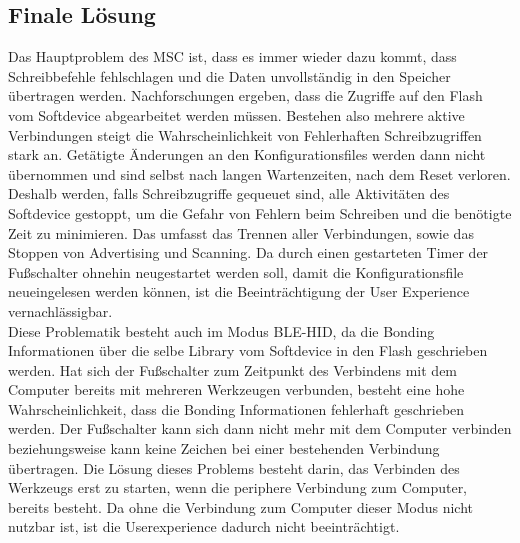 \subsection{Finale Lösung}
Das Hauptproblem des \ac{MSC} ist, dass es immer wieder dazu kommt, dass Schreibbefehle fehlschlagen und die Daten unvollständig in den Speicher übertragen werden. Nachforschungen ergeben, dass die Zugriffe auf den Flash vom Softdevice abgearbeitet werden müssen. Bestehen also mehrere aktive Verbindungen steigt die Wahrscheinlichkeit von Fehlerhaften Schreibzugriffen stark an. Getätigte Änderungen an den Konfigurationsfiles werden dann nicht übernommen und sind selbst nach langen Wartenzeiten, nach dem Reset verloren. Deshalb werden, falls Schreibzugriffe gequeuet sind, alle Aktivitäten des Softdevice gestoppt, um die Gefahr von Fehlern beim Schreiben und die benötigte Zeit zu minimieren. Das umfasst das Trennen aller Verbindungen, sowie das Stoppen von Advertising und Scanning. Da durch einen gestarteten Timer der Fußschalter ohnehin neugestartet werden soll, damit die Konfigurationsfile neueingelesen werden können, ist die Beeinträchtigung der User Experience vernachlässigbar.\\
Diese Problematik besteht auch im Modus \ac{BLE}-\ac{HID}, da die Bonding Informationen über die selbe Library vom Softdevice in den Flash geschrieben werden. Hat sich der Fußschalter zum Zeitpunkt des Verbindens mit dem Computer bereits mit mehreren Werkzeugen verbunden, besteht eine hohe Wahrscheinlichkeit, dass die Bonding Informationen fehlerhaft geschrieben werden. Der Fußschalter kann sich dann nicht mehr mit dem Computer verbinden beziehungsweise kann keine Zeichen bei einer bestehenden Verbindung übertragen. Die Lösung dieses Problems besteht darin, das Verbinden des Werkzeugs erst zu starten, wenn die periphere Verbindung zum Computer, bereits besteht. Da ohne die Verbindung zum Computer dieser Modus nicht nutzbar ist, ist die Userexperience dadurch nicht beeinträchtigt.

